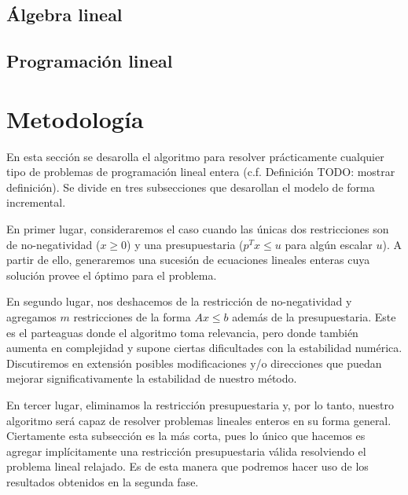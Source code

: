\documentclass[11pt]{article}
\begin{document}
\subsection*{Álgebra lineal}
\subsection*{Programación lineal}

\section*{Metodología}
En esta sección se desarolla el algoritmo para resolver prácticamente cualquier tipo de problemas de
programación lineal entera (c.f. Definición TODO: mostrar definición). Se divide en tres
subsecciones que desarollan el modelo de forma incremental.

En primer lugar, consideraremos el caso cuando las únicas dos restricciones son de no-negatividad
($x \geq 0$) y una presupuestaria ($p^Tx \leq u$ para algún escalar $u$). A partir de ello,
generaremos una sucesión de ecuaciones lineales enteras cuya solución provee el óptimo para el
problema.

En segundo lugar, nos deshacemos de la restricción de no-negatividad y agregamos $m$ restricciones
de la forma $Ax \leq b$ además de la presupuestaria. Este es el parteaguas donde el algoritmo toma
relevancia, pero donde también aumenta en complejidad y supone ciertas dificultades con la
estabilidad numérica. Discutiremos en extensión posibles modificaciones y/o direcciones que puedan
mejorar significativamente la estabilidad de nuestro método.

En tercer lugar, eliminamos la restricción presupuestaria y, por lo tanto, nuestro algoritmo será
capaz de resolver problemas lineales enteros en su forma general. Ciertamente esta subsección es la
más corta, pues lo único que hacemos es agregar implícitamente una restricción presupuestaria válida
resolviendo el problema lineal relajado. Es de esta manera que podremos hacer uso de los resultados
obtenidos en la segunda fase.
\end{document}
